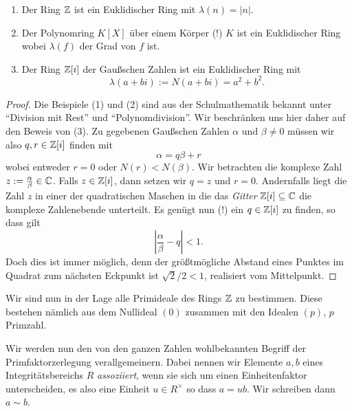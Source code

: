 \documentclass{book}
\begin{document}
\begin{prop}
    \label{prop:euklid}
    \begin{enumerate}
        \item Der Ring $\mathbb{Z}$ ist ein Euklidischer Ring mit $\lambda(n) = |n|$.
        \item Der Polynomring $K[X]$ über einem Körper (!) $K$ ist ein
            Euklidischer Ring wobei $\lambda(f)$ der Grad von $f$ ist. 
        \item Der Ring $\mathbb{Z}[i]$ der Gaußschen Zahlen ist ein Euklidischer Ring mit
            \[
                \lambda(a + bi) := N(a+bi) = a^2 + b^2.
            \]
    \end{enumerate}
\end{prop}
\begin{proof}
    Die Beispiele (1) und (2) sind aus der Schulmathematik bekannt unter
    ``Division mit Rest'' und ``Polynomdivision''. Wir beschränken uns hier
    daher auf den Beweis von (3). Zu gegebenen Gaußschen Zahlen $\alpha$ und
    $\beta \neq 0$ müssen wir also $q,r \in \mathbb{Z}[i]$ finden mit
    \[
        \alpha = q \beta + r
    \]
    wobei entweder $r=0$ oder $N(r) < N(\beta)$. Wir betrachten die komplexe
    Zahl $z := \frac{\alpha}{\beta} \in \mathbb{C}$. Falls $z \in
    \mathbb{Z}[i]$, dann setzen wir $q = z$ und $r = 0$.
    Andernfalls liegt die Zahl $z$ in einer der quadratischen Maschen in die
    das \emph{Gitter} $\mathbb{Z}[i] \subseteq \mathbb{C}$ die komplexe Zahlenebende
    unterteilt. Es genügt nun (!) ein $q \in \mathbb{Z}[i]$ zu finden, so dass gilt
    \begin{equation}
            |\frac{\alpha}{\beta} - q| < 1.
    \end{equation}
    Doch dies ist immer möglich, denn der größtmögliche Abstand eines Punktes
    im Quadrat zum nächsten Eckpunkt ist $\sqrt{2}/2 < 1$, realisiert vom Mittelpunkt. 
\end{proof}

\begin{exa}
    \label{exa:integers}
    Wir sind nun in der Lage alle Primideale des Rings $\mathbb{Z}$ zu bestimmen.
    Diese bestehen nämlich aus dem Nullideal $(0)$ zusammen mit den Idealen
    $(p)$, $p$ Primzahl. 
\end{exa}

Wir werden nun den von den ganzen Zahlen wohlbekannten Begriff der
Primfaktorzerlegung verallgemeinern. Dabei nennen wir Elemente $a,b$ eines
Integritätsbereichs $R$ \emph{assoziiert}, wenn sie sich um einen
Einheitenfaktor unterscheiden, es also eine Einheit $u \in R^{\times}$ so dass
$a = u b$. Wir schreiben dann $a \sim b$. 
\end{document}
